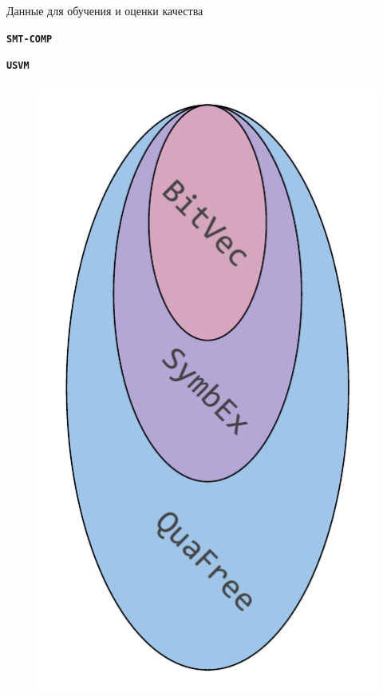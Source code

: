 \documentclass[14pt,aspectratio=169,hyperref={pdftex,unicode},xcolor=dvipsnames]{beamer}
\begin{document}
\begin{frame}{Данные для обучения и оценки качества}

\begin{minipage}{0.5\textwidth}

\textbf{\texttt{SMT-COMP}} \cite{smt-comp-2023-benchmarks}

\end{minipage}%
\begin{minipage}{0.5\textwidth}

\textbf{\texttt{USVM}} \cite{usvm-github}

\end{minipage}

\begin{minipage}{0.5\textwidth}

\begin{figure}[ht]
\begin{center}
  \includegraphics[scale=0.45]{./assets/smt-comp-datasets.pdf}
\end{center}
\end{figure}


\end{minipage}
\end{frame}
\end{document}

